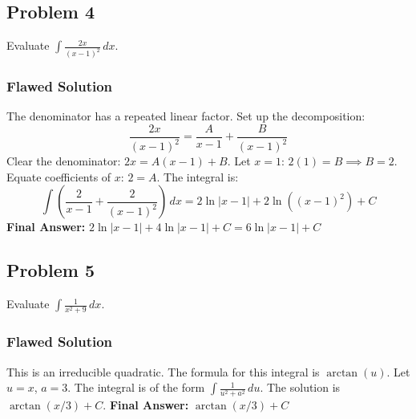 \documentclass{article}
\begin{document}
\subsection{Problem 4}
Evaluate $\displaystyle \int \frac{2x}{(x-1)^2} \,dx$.
\subsubsection*{Flawed Solution}
The denominator has a repeated linear factor. Set up the decomposition:
\[ \frac{2x}{(x-1)^2} = \frac{A}{x-1} + \frac{B}{(x-1)^2} \]
Clear the denominator: $2x = A(x-1) + B$.
Let $x=1$: $2(1) = B \implies B=2$.
Equate coefficients of $x$: $2=A$.
The integral is:
\[ \int \left(\frac{2}{x-1} + \frac{2}{(x-1)^2}\right) \,dx = 2\ln|x-1| + 2\ln((x-1)^2) + C \]
\textbf{Final Answer:} $\displaystyle 2\ln|x-1| + 4\ln|x-1| + C = 6\ln|x-1| + C$

\subsection{Problem 5}
Evaluate $\displaystyle \int \frac{1}{x^2+9} \,dx$.
\subsubsection*{Flawed Solution}
This is an irreducible quadratic. The formula for this integral is $\arctan(u)$.
Let $u=x$, $a=3$. The integral is of the form $\int \frac{1}{u^2+a^2} \,du$.
The solution is $\arctan(x/3)+C$.
\textbf{Final Answer:} $\displaystyle \arctan(x/3) + C$
\end{document}
